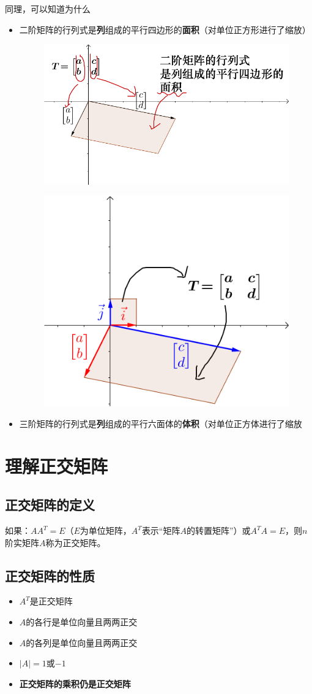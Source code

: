 \documentclass[12pt]{article}
\begin{document}
同理，可以知道为什么
\begin{itemize}
    \item 二阶矩阵的行列式是\textbf{列}组成的平行四边形的\textbf{面积}（对单位正方形进行了缩放）
\begin{figure}[H]
    \centering
    \includegraphics[width=.5\textwidth]{fig/UnderstandDeterminant_3.png}
\end{figure}
\begin{figure}[H]
    \centering
    \includegraphics[width=.5\textwidth]{fig/UnderstandDeterminant_4.png}
\end{figure}  
    \item 三阶矩阵的行列式是\textbf{列}组成的平行六面体的\textbf{体积}（对单位正方体进行了缩放
\end{itemize}

\section{理解正交矩阵\cite{Fantastic_Matrix_1}}
\subsection{正交矩阵的定义}
如果：$AA^T=E$（$E$为单位矩阵，$A^T$表示“矩阵$A$的转置矩阵”）或$A^TA=E$，则$n$阶实矩阵$A$称为正交矩阵。

\subsection{正交矩阵的性质}
\begin{itemize}
\setlength{\itemsep}{0pt}
\setlength{\parsep}{0pt}
\setlength{\parskip}{0pt}
    \item $A^T$是正交矩阵
    \item $A$的各行是单位向量且两两正交
    \item $A$的各列是单位向量且两两正交
    \item $|A|=1$或$-1$
    \item \textbf{正交矩阵的乘积仍是正交矩阵}
\end{itemize}
\end{document}
